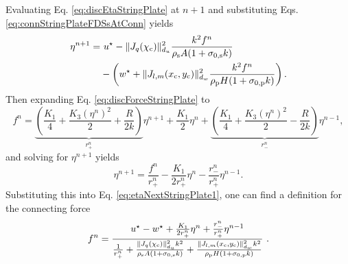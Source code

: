 Evaluating Eq. \eqref{eq:discEtaStringPlate} at $n+1$ and substituting Eqs. \eqref{eq:connStringPlateFDSsAtConn} yields
\begin{equation}\label{eq:etaNextStringPlate1}
    \begin{aligned}
    \eta^{n+1} =&\ u^\star- \lVert J_q(\chi_\ctxt)\rVert_{d_u}^2\frac{k^2f^n}{\rho_\stxt A(1+\szX[\stxt]k)} \\
    &- \left(w^\star + \lVert J_{l, m}(x_\ctxt, y_\ctxt)\rVert_{d_w}^2\frac{k^2f^n}{\rho_\ptxt H(1+\szX[\ptxt]k)}\right).
    \end{aligned}
\end{equation}
Then expanding Eq. \eqref{eq:discForceStringPlate} to
\begin{equation*}
     f^n = \underbrace{\left(\frac{K_1}{4}+\frac{K_3(\eta^n)^2}{2} + \frac{R}{2k}\right)}_{r_+^n}\eta^{n+1} + \frac{K_1}{2}\eta^n + \underbrace{\left(\frac{K_1}{4}+\frac{K_3(\eta^n)^2}{2} - \frac{R}{2k}\right)}_{r_-^n}\eta^{n-1},
\end{equation*}
and solving for $\eta^{n+1}$ yields
\begin{equation}
    \eta^{n+1} = \frac{f^n}{r_+^n} - \frac{K_1}{2r_+^n}\eta^n - \frac{r_-^n}{r_+^n}\eta^{n-1}.
\end{equation}
Substituting this into Eq. \eqref{eq:etaNextStringPlate1}, one can find a definition for the connecting force
\begin{equation}\label{eq:stringPlateForce}
    f^n = \frac{u^\star - w^\star + \frac{K_1}{2r_+^n}\eta^n + \frac{r_-^n}{r_+^n}\eta^{n-1}}{\frac{1}{r_+^n} + \frac{\lVert J_q(\chi_\ctxt)\rVert_{d_u}^2k^2}{\rho_\stxt A(1+\szX[\stxt]k)} + \frac{\lVert J_{l, m}(x_\ctxt, y_\ctxt)\rVert_{d_w}^2k^2}{\rho_\ptxt H(1+\szX[\ptxt]k)}}\ .
\end{equation}

